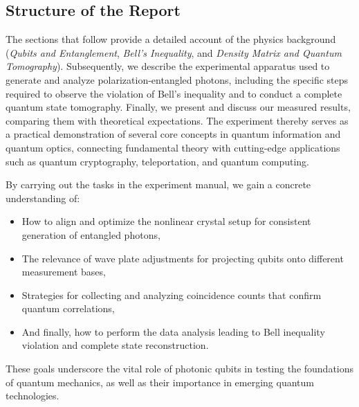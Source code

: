 \subsection*{Structure of the Report}
The sections that follow provide a detailed account of the physics background (\emph{Qubits and Entanglement}, \emph{Bell’s Inequality}, and \emph{Density Matrix and Quantum Tomography}). Subsequently, we describe the experimental apparatus used to generate and analyze polarization-entangled photons, including the specific steps required to observe the violation of Bell’s inequality and to conduct a complete quantum state tomography. Finally, we present and discuss our measured results, comparing them with theoretical expectations. The experiment thereby serves as a practical demonstration of several core concepts in quantum information and quantum optics, connecting fundamental theory with cutting-edge applications such as quantum cryptography, teleportation, and quantum computing.

By carrying out the tasks in the experiment manual, we gain a concrete understanding of:
\begin{itemize}
    \item How to align and optimize the nonlinear crystal setup for consistent generation of entangled photons,
    \item The relevance of wave plate adjustments for projecting qubits onto different measurement bases,
    \item Strategies for collecting and analyzing coincidence counts that confirm quantum correlations,
    \item And finally, how to perform the data analysis leading to Bell inequality violation and complete state reconstruction.
\end{itemize}

These goals underscore the vital role of photonic qubits in testing the foundations of quantum mechanics, as well as their importance in emerging quantum technologies. 
